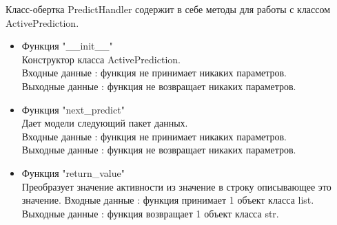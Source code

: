 \documentclass[a4document]{article}
\begin{document}
{\begin{itemize}
        Класс-обертка PredictHandler содержит в себе методы для работы с классом ActivePrediction.
        
        \begin{itemize}
            \item Функция "\_\_init\_\_" \\
                Конструктор класса ActivePrediction.\\
                Входные данные : функция не принимает никаких параметров. \\ 
                Выходные данные : функция не возвращает никаких параметров.
            \item Функция "next\_predict" \\
                Дает модели следующий пакет данных.\\
                Входные данные : функция не принимает никаких параметров. \\ 
                Выходные данные : функция не возвращает никаких параметров.
            \item Функция "return\_value" \\
                Преобразует значение активности из значение в строку описывающее
                это значение.
                Входные данные : функция принимает 1 объект класса list. \\ 
                Выходные данные : функция возвращает 1 объект класса str.
        \end{itemize}
        
        
\end{itemize}
}
\end{document}
